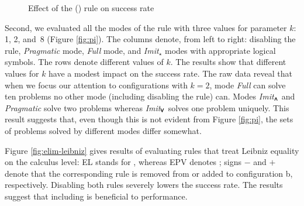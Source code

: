 
\begin{figure}[t]
  \begin{center}
    \def\arraystretch{1.1}%
    \caption{Effect of the () rule on success rate }
    \label{fig:cases}
  \end{center}
\end{figure}

Second, we evaluated all the modes of the  rule with three values for
parameter $k$: 1, 2, and~8 (Figure \ref{fig:pi}). The columns denote, from left to
right: disabling the  rule, \emph{Pragmatic} mode, \emph{Full} mode,
and \emph{Imit}$_\star$ modes with appropriate logical symbols. The rows denote
different values of $k$. The results show that different values for $k$ have a
modest impact on the success rate. The raw data reveal that when we focus our
attention to configurations with $k=2$, mode \emph{Full} can solve ten problems
no other mode (including disabling the  rule) can. Modes
\emph{Imit}$_{\pmb{\land}}$ and \emph{Pragmatic} solve two  problems whereas
\emph{Imit}$_{\pmb{\lor}}$ solves one problem uniquely. This result suggests that, even
though this is not evident from Figure \ref{fig:pi}, the sets of problems solved 
by different modes differ somewhat.

Figure \ref{fig:elim-leibniz} gives results of evaluating rules that treat
Leibniz equality on the calculus level: EL stands for ,
whereas EPV denotes ; signs $-$ and $+$ denote that the corresponding rule is
removed from or added to configuration b, respectively. Disabling both rules
severely lowers the success rate. The results suggest that including
 is beneficial to performance.

